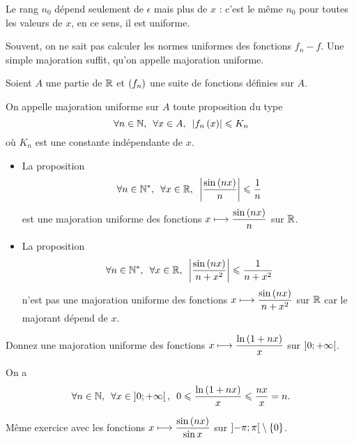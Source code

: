Le rang \(n_0\) dépend seulement de \(\epsilon\) mais plus de \(x\) : c'est le même \(n_0\) pour toutes les valeurs de \(x\), en ce sens, il est uniforme.

Souvent, on ne sait pas calculer les normes uniformes des fonctions \(f_n-f\). Une simple majoration suffit, qu'on appelle majoration uniforme.

\begin{defi}
Soient \(A\) une partie de \(\mathbb{R}\) et \(\left(f_n\right)\) une suite de fonctions définies sur \(A\).

On appelle majoration uniforme sur \(A\) toute proposition du type \[\quantifs{\forall n\in\N;\forall x\in A}\abs{f_n\paren{x}}\leq K_n\] où \(K_n\) est une constante indépendante de \(x\).
\end{defi}

\begin{ex}
\begin{itemize}
    \item La proposition \[\quantifs{\forall n\in\Ns;\forall x\in\R}\abs{\dfrac{\sin\paren{nx}}{n}}\leq\dfrac{1}{n}\] est une majoration uniforme des fonctions \(x\longmapsto\dfrac{\sin\left(nx\right)}{n}\) sur \(\mathbb{R}\). \\
    \item La proposition \[\quantifs{\forall n\in\Ns;\forall x\in\R}\abs{\dfrac{\sin\paren{nx}}{n+x^2}}\leq\dfrac{1}{n+x^2}\] n'est pas une majoration uniforme des fonctions \(x\longmapsto\dfrac{\sin\left(nx\right)}{n+x^2}\) sur \(\mathbb{R}\) car le majorant dépend de \(x\).
\end{itemize}
\end{ex}

\begin{exo}
Donnez une majoration uniforme des fonctions \(x\longmapsto\dfrac{\ln\left(1+nx\right)}{x}\) sur \(\left]0;+\infty\right[\).
\end{exo}

\begin{corr}
On a \[\quantifs{\forall n\in\N;\forall x\in\intervee{0}{\pinf}}0\leq\dfrac{\ln\paren{1+nx}}{x}\leq\dfrac{nx}{x}=n.\]
\end{corr}

\begin{exo}
Même exercice avec les fonctions \(x\longmapsto\dfrac{\sin\left(nx\right)}{\sin x}\) sur \(\left]-\pi;\pi\right[\setminus\left\lbrace0\right\rbrace\).
\end{exo}

